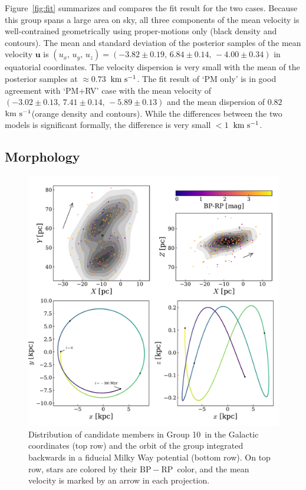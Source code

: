 \documentclass[modern,letterpaper]{aastex61}
\newcommand{\figname}{Figure}
\newcommand{\groupTen}{Group 10}
\newcommand{\bs}[1]{\boldsymbol{#1}}
\renewcommand{\vec}[1]{\bs{#1}}
\newcommand{\kms}{\ensuremath{\rm km~s^{-1}}}
\newcommand{\bprp}{\ensuremath{\mathrm{BP}-\mathrm{RP}}}
\begin{document}
\figname~\ref{fig:fit} summarizes and compares the fit result for the two cases.
Because this group spans a large area on sky, all three components of the mean
velocity is well-contrained geometrically using proper-motions only
(black density and contours).
The mean and standard deviation of the posterior samples of the mean velocity $\vec{u}$
is $(u_x,\,u_y,\,u_z) = (-3.82\pm0.19,\,6.84\pm0.14,\,-4.00\pm0.34)$ in
equatorial coordinates.
The velocity dispersion is very small with the mean of the posterior samples at
$\approx 0.73$~\kms.
The fit result of `PM only' is in good agreement with `PM+RV' case
with the mean velocity of $(-3.02\pm0.13,\,7.41\pm0.14,\,-5.89\pm0.13)$ and
the mean dispersion of $0.82$~\kms (orange density and contours).
While the differences between the two models is significant formally,
the difference is very small $<1$~\kms.

\subsection{Morphology}

\begin{figure}
  \includegraphics[width=0.95\linewidth]{orbit_morphology.pdf}
  \caption{Distribution of candidate members in \groupTen\ in
    the Galactic coordinates (top row) and the orbit of the group
    integrated backwards in
    a fiducial Milky Way potential (bottom row).
    On top row, stars are colored by their \bprp\ color, and
    the mean velocity is marked by an arrow in each projection.}
  \label{fig:orbit_morphology}
\end{figure}
\end{document}
